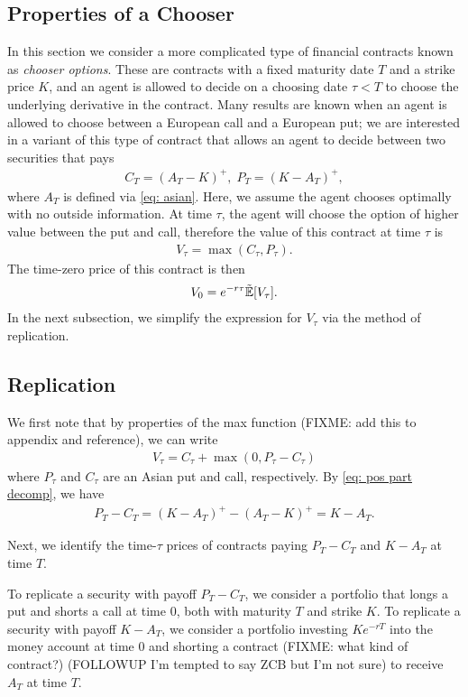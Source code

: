 \documentclass[reqno]{amsart}
\begin{document}
\subsection{Properties of a Chooser}
In this section we consider a more complicated type of financial contracts known as \emph{chooser options}. 
These are contracts with a fixed maturity date $T$ and a strike price $K$, and an agent is allowed to decide on a choosing date $\tau < T$ to choose the underlying derivative in the contract.
Many results are known when an agent is allowed to choose between a European call and a European put; we are interested in a variant of this type of contract that allows an agent to decide between two securities that pays 
\begin{align}
     C_T = (A_T - K)^+, \; P_T = (K - A_T)^+,
\end{align}
where $A_T$ is defined via \eqref{eq: asian}.
Here, we assume the agent chooses optimally with no outside information. At time $\tau$, the agent will choose the option of higher value between the put and call, therefore the value of this contract at time $\tau$ is 
\begin{align}\label{eq: V_tau}
     V_\tau = \max(C_\tau, P_\tau).
\end{align}
The time-zero price of this contract is then 
\begin{align}
      V_0 = e^{-r\tau}\tilde{\mathbb{E}}[V_\tau].
\end{align}
In the next subsection, we simplify the expression for $V_\tau$ via the method of replication. 
\subsection{Replication}
We first note that by properties of the max function (FIXME: add this to appendix and reference), we can write 
\begin{align}\label{eq: chooser formula PC}
     V_\tau = C_\tau + \max(0, P_\tau - C_\tau)
\end{align}
where $P_\tau$ and $C_\tau$ are an Asian put and call, respectively.
By \eqref{eq: pos part decomp}, we have
\begin{align}\label{eq: P - C}
     P_T - C_T = (K-A_T)^+ - (A_T - K)^+ = K - A_T. 
\end{align}

Next, we identify the time-$\tau$ prices of contracts paying $P_T - C_T$ and $K - A_T$ at time $T$.

To replicate a security with payoff $P_T - C_T$, we consider a portfolio that longs a put and shorts a call at time $0$, both with maturity $T$ and strike $K$.
To replicate a security with payoff $K - A_T$,  we consider a portfolio investing $Ke^{-rT}$ into the money account at time 0 and shorting a contract (FIXME: what kind of contract?) (FOLLOWUP I'm tempted to say ZCB but I'm not sure) to receive $A_T$ at time $T$. 
\end{document}
